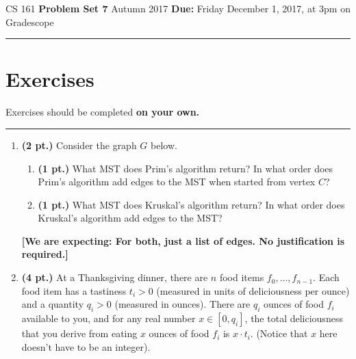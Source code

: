 \documentclass{article}
\newcommand{\expecting}[1]{\noindent\textbf{[We are expecting: #1]}}
\newcommand{\pts}[1]{\textbf{(#1 pt.)}}
\begin{document}
\noindent
CS 161 \hfill \textbf{Problem Set 7} \newline 
{Autumn 2017} \hfill \textbf{Due:} Friday December 1, 2017, at 3pm on Gradescope

\noindent
\rule{\linewidth}{0.4pt}

\section*{Exercises}
Exercises should be completed \textbf{on your own.}  

\noindent
\rule{\linewidth}{0.4pt}

\begin{enumerate}
\item \pts{2} Consider the graph $G$ below. 
\begin{center}
\end{center}
\begin{enumerate}
\item \pts{1} What MST does Prim's algorithm return?  In what order does Prim's algorithm add edges to the MST when started from vertex $C$?

\item \pts{1} What MST does Kruskal's algorithm return? In what order does Kruskal's algorithm add edges to the MST?

\end{enumerate}
\expecting{For both, just a list of edges.  No justification is required.}


\vspace{1cm}
\item \pts{4} At a Thanksgiving dinner, there are $n$ food items $f_0,\ldots, f_{n-1}$.  Each food item has a tastiness $t_i > 0$ (measured in units of deliciousness per ounce) and a quantity $q_i > 0$ (measured in ounces).  There are $q_i$ ounces of food $f_i$ available to you, and for any real number $x \in [0,q_i]$, the total deliciousness that you derive from eating $x$ ounces of food $f_i$ is $x \cdot t_i$.  (Notice that $x$ here doesn't have to be an integer). 


\end{enumerate}
\end{document}
